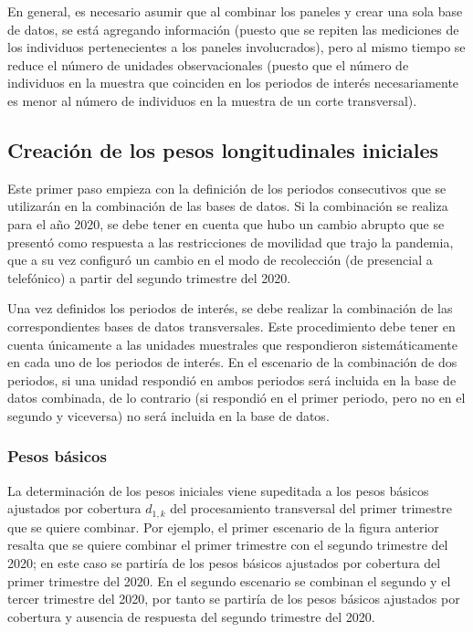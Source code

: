 \documentclass[
  12pt,
  spanish,
]{book}
\begin{document}
En general, es necesario asumir que al combinar los paneles y crear una sola base de datos, se está agregando información (puesto que se repiten las mediciones de los individuos pertenecientes a los paneles involucrados), pero al mismo tiempo se reduce el número de unidades observacionales (puesto que el número de individuos en la muestra que coinciden en los periodos de interés necesariamente es menor al número de individuos en la muestra de un corte transversal).

\hypertarget{creaciuxf3n-de-los-pesos-longitudinales-iniciales}{%
\subsection{Creación de los pesos longitudinales iniciales}\label{creaciuxf3n-de-los-pesos-longitudinales-iniciales}}

Este primer paso empieza con la definición de los periodos consecutivos que se utilizarán en la combinación de las bases de datos. Si la combinación se realiza para el año 2020, se debe tener en cuenta que hubo un cambio abrupto que se presentó como respuesta a las restricciones de movilidad que trajo la pandemia, que a su vez configuró un cambio en el modo de recolección (de presencial a telefónico) a partir del segundo trimestre del 2020.

Una vez definidos los periodos de interés, se debe realizar la combinación de las correspondientes bases de datos transversales. Este procedimiento debe tener en cuenta únicamente a las unidades muestrales que respondieron sistemáticamente en cada uno de los periodos de interés. En el escenario de la combinación de dos periodos, si una unidad respondió en ambos periodos será incluida en la base de datos combinada, de lo contrario (si respondió en el primer periodo, pero no en el segundo y viceversa) no será incluida en la base de datos.

\hypertarget{pesos-buxe1sicos}{%
\subsubsection{Pesos básicos}\label{pesos-buxe1sicos}}

La determinación de los pesos iniciales viene supeditada a los pesos básicos ajustados por cobertura \(d_{1, k}\) del procesamiento transversal del primer trimestre que se quiere combinar. Por ejemplo, el primer escenario de la figura anterior resalta que se quiere combinar el primer trimestre con el segundo trimestre del 2020; en este caso se partiría de los pesos básicos ajustados por cobertura del primer trimestre del 2020. En el segundo escenario se combinan el segundo y el tercer trimestre del 2020, por tanto se partiría de los pesos básicos ajustados por cobertura y ausencia de respuesta del segundo trimestre del 2020.
\end{document}
